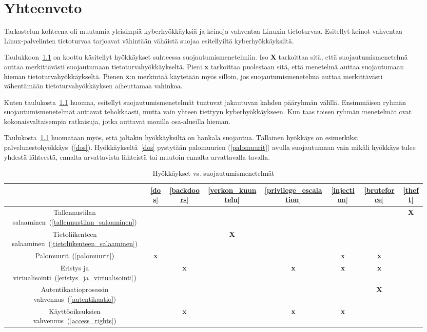 \chapter{Yhteenveto}\label{yhteenveto}

Tarkastelun kohteena oli muutamia yleisimpiä kyberhyökkäyksiä ja keinoja vahventaa Linuxin tietoturvaa. Esitellyt keinot vahventaa Linux-palvelinten tietoturvaa tarjoavat vähintään vähäistä suojaa esitellyiltä kyberhyökkäyksiltä.

Taulukkoon~\ref{tab:security-table} on koottu käsitellyt hyökkäykset suhteessa suojautumismenetelmiin. Iso \textbf{X} tarkoittaa sitä, että suojautumismenetelmä auttaa merkittävästi suojautumaan tietoturvahyökkäykseltä. Pieni \textbf{x} tarkoittaa puolestaan sitä, että menetelmä auttaa suojautumaan hieman tietoturvahyökkäykseltä. Pienen \textbf{x}:n merkintää käytetään myös silloin, jos suojautumismenetelmä auttaa merkittävästi vähentämään tietoturvahyökkäyksen aiheuttamaa vahinkoa.

Kuten taulukosta~\ref{tab:security-table} huomaa, esitellyt suojautumismenetelmät tuntuvat jakautuvan kahden pääryhmän välillä. Ensimmäisen ryhmän suojautumismenetelmät auttavat tehokkaasti, mutta vain yhteen tiettyyn kyberhyökkäykseen. Kun taas toisen ryhmän menetelmät ovat kokonaisvaltaisempia ratkaisuja, jotka auttavat monilla osa-alueilla hieman.

Taulukosta~\ref{tab:security-table} huomataan myös, että joltakin hyökkäyksiltä on hankala suojautua. Tällainen hyökkäys on esimerkiksi palvelunestohyökkäys~(\ref{dos}). Hyökkäykseltä~\ref{dos} pystytään palomuurien (\ref{palomuurit}) avulla suojautumaan vain mikäli hyökkäys tulee yhdestä lähteestä, ennalta arvattavista lähteistä tai muutoin ennalta-arvattavalla tavalla.

\begin{table}
\centering{}\caption{Hyökkäykset vs. suojautumismenetelmät\label{tab:security-table}}
\begin{tabular}{c|c|c|c|c|c|c|c|}
   &\ref{dos}&\ref{backdoors}&\ref{verkon_kuuntelu}&\ref{privilege_escalation}&\ref{injection}&\ref{bruteforce}&\ref{theft} \tabularnewline\hline
    Tallennustilan salaaminen~(\ref{tallennustilan_salaaminen}) & & & & & & & \textbf{X}\tabularnewline\hline
    Tietoliikenteen salaaminen~(\ref{tietoliikenteen_salaaminen}) & & & \textbf{X} & & & &\tabularnewline\hline
    Palomuurit~(\ref{palomuurit}) & \textbf{x} & & & & \textbf{x} & \textbf{x} &\tabularnewline\hline
    Eristys ja virtualisointi~(\ref{eristys_ja_virtualisointi}) & & \textbf{x} & & \textbf{x} & \textbf{x} & \textbf{x} &\tabularnewline\hline
    Autentikaatioprosessin vahvennus~(\ref{autentikaatio}) & & & & & & \textbf{X} &\tabularnewline\hline
    Käyttöoikeuksien vahvennus~(\ref{access_rights}) & & \textbf{x} & & \textbf{x} & \textbf{x} & &\tabularnewline\hline
\end{tabular}
\end{table}

